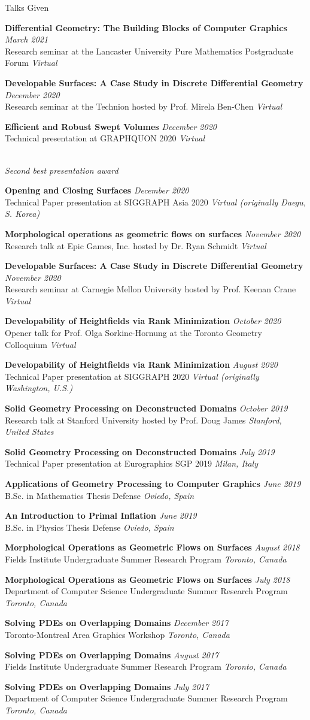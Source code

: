 \documentclass{resume}
\newcommand{\talk}[4]{
    {\bf #1} \hfill {\em \small #2} \\ %
    {\small #3} \hfill {\em \small #4}
}
\begin{document}
\begin{rSection}{Talks Given}
\talk{Differential Geometry: The Building Blocks of Computer Graphics}{March 2021}
{Research seminar at the Lancaster University Pure Mathematics Postgraduate Forum}{Virtual}

\talk{Developable Surfaces: A Case Study in Discrete Differential Geometry}{December 2020}
{Research seminar at the Technion hosted by Prof. Mirela Ben-Chen}{Virtual}

\talk{Efficient and Robust Swept Volumes}{December 2020}
{Technical presentation at GRAPHQUON 2020}{Virtual}
\\{\it Second best presentation award}

\talk{Opening and Closing Surfaces}{December 2020}
{Technical Paper presentation at SIGGRAPH Asia 2020}{Virtual (originally Daegu, S. Korea)}

\talk{Morphological operations as geometric flows on surfaces}{November 2020}
{Research talk at Epic Games, Inc. hosted by Dr. Ryan Schmidt}{Virtual}

\talk{Developable Surfaces: A Case Study in Discrete Differential Geometry}{November 2020}
{Research seminar at Carnegie Mellon University hosted by Prof. Keenan Crane}{Virtual}

\talk{Developability of Heightfields via Rank Minimization}{October 2020}
{Opener talk for Prof. Olga Sorkine-Hornung at the Toronto Geometry Colloquium}{Virtual}

\talk{Developability of Heightfields via Rank Minimization}{August 2020}
{Technical Paper presentation at SIGGRAPH 2020}{Virtual (originally Washington, U.S.)}

\talk{Solid Geometry Processing on Deconstructed Domains}{October 2019}
{Research talk at Stanford University hosted by Prof. Doug James}{Stanford, United States}

\talk{Solid Geometry Processing on Deconstructed Domains}{July 2019}
{Technical Paper presentation at Eurographics SGP 2019}{Milan, Italy}

\talk{Applications of Geometry Processing to Computer Graphics}{June 2019}
{B.Sc. in Mathematics Thesis Defense}{Oviedo, Spain}

\talk{An Introduction to Primal Inflation}{June 2019}
{B.Sc. in Physics Thesis Defense}{Oviedo, Spain}

\talk{Morphological Operations as Geometric Flows on Surfaces}{August 2018}
{Fields Institute Undergraduate Summer Research Program}{Toronto, Canada}

\talk{Morphological Operations as Geometric Flows on Surfaces}{July 2018}
{Department of Computer Science Undergraduate Summer Research Program}{Toronto, Canada}

\talk{Solving PDEs on Overlapping Domains}{December 2017}
{Toronto-Montreal Area Graphics Workshop}{Toronto, Canada}

\talk{Solving PDEs on Overlapping Domains}{August 2017}
{Fields Institute Undergraduate Summer Research Program}{Toronto, Canada}

\talk{Solving PDEs on Overlapping Domains}{July 2017}
{Department of Computer Science Undergraduate Summer Research Program}{Toronto, Canada}

\end{rSection}
\end{document}
